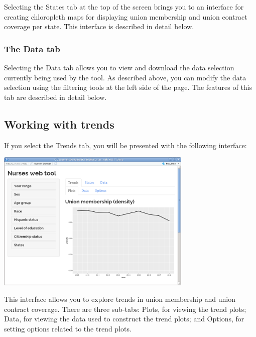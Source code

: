 \documentclass[letterpaper,12pt]{article}
\begin{document}
Selecting the States tab at the top of the screen brings you to an
interface for creating chloropleth maps for displaying union
membership and union contract coverage per state. This interface is
described in detail below.

\subsubsection{The Data tab}

Selecting the Data tab allows you to view and download the data
selection currently being used by the tool. As described above, you
can modify the data selection using the filtering tools at the left
side of the page. The features of this tab are described in detail
below.

\subsection{Working with trends} \label{working_with_trends}

If you select the Trends tab, you will be presented with the following
interface:
\begin{center}
  \includegraphics[width=0.7\textwidth]{images/trends_interface.png}
\end{center}
This interface allows you to explore trends in union membership and
union contract coverage. There are three sub-tabs: Plots, for viewing
the trend plots; Data, for viewing the data used to construct the
trend plots; and Options, for setting options related to the trend
plots.
\end{document}
